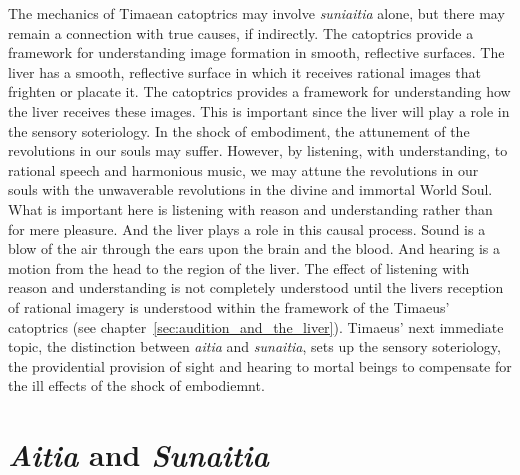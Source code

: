 The mechanics of Timaean catoptrics may involve \emph{suniaitia} alone, but there may remain a connection with true causes, if indirectly. The catoptrics provide a framework for understanding image formation in smooth, reflective surfaces. The liver has a smooth, reflective surface in which it receives rational images that frighten or placate it. The catoptrics provides a framework for understanding how the liver receives these images. This is important since the liver will play a role in the sensory soteriology. In the shock of embodiment, the attunement of the revolutions in our souls may suffer. However, by listening, with understanding, to rational speech and harmonious music, we may attune the revolutions in our souls with the unwaverable revolutions in the divine and immortal World Soul. What is important here is listening with reason and understanding rather than for mere pleasure. And the liver plays a role in this causal process. Sound is a blow of the air through the ears upon the brain and the blood. And hearing is a motion from the head to the region of the liver. The effect of listening with reason and understanding is not completely understood until the livers reception of rational imagery is understood within the framework of the Timaeus' catoptrics (see chapter~\ref{sec:audition_and_the_liver}). Timaeus' next immediate topic, the distinction between \emph{aitia} and \emph{sunaitia}, sets up the sensory soteriology, the providential provision of sight and hearing to mortal beings to compensate for the ill effects of the shock of embodiemnt. 


\section{\emph{Aitia} and \emph{Sunaitia}} %
\label{sec:_emph_aitia_and_emph_sunaitia}

